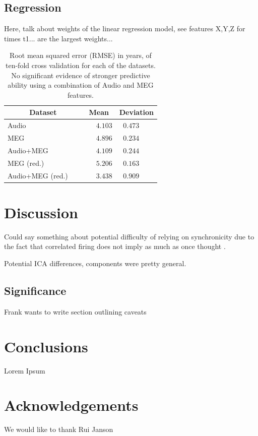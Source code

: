 \documentclass[a4paper]{article}
\begin{document}
\subsection{Regression}

Here, talk about weights of the linear regression model, see features X,Y,Z for times t1... are the largest weights...

\begin{table}[t]
  \caption{Root mean squared error (RMSE) in years, of ten-fold cross validation for each of the datasets. No significant evidence of stronger predictive ability using a combination of Audio and MEG features.}
  \label{tab:rmse}
  \centering
  \begin{tabular}{ l@{}c  c }
    \toprule
    \multicolumn{1}{c}{\textbf{Dataset}} & \multicolumn{1}{c}{\textbf{Mean}} & \multicolumn{1}{c}{\textbf{Deviation}} \\
    \midrule
    Audio~~~                             & ~~~$4.103$         &     $0.473$~~~       \\
    MEG~~~                               & ~~~$4.896$         &     $0.234$~~~       \\
    Audio+MEG~~~                       & ~~~$4.109$         &     $0.244$~~~       \\

    MEG (red.)~~~                     & ~~~$5.206$         &     $0.163$~~~       \\
    Audio+MEG (red.)~~~                & ~~~$3.438$         &     $0.909$~~~       \\
    \bottomrule
  \end{tabular}
\end{table}

\section{Discussion}

Could say something about potential difficulty of relying on synchronicity due to the fact that correlated firing does not imply as much as once thought \cite{Moreno-Bote2014}.

Potential ICA differences, components were pretty general.

\subsection{Significance}

Frank wants to write section outlining caveats

\section{Conclusions}

Lorem Ipsum

\section{Acknowledgements}

We would like to thank Rui Janson





\end{document}

